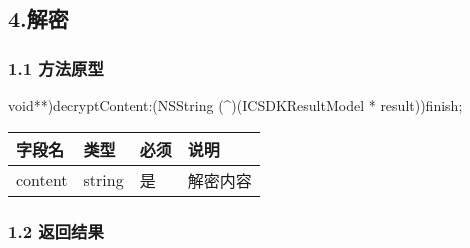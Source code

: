 \documentclass[letterpaper,10pt,english]{sphinxmanual}
\begin{document}

\begin{sphinxVerbatim}[commandchars=\\\{\}]
     
\end{sphinxVerbatim}


\subsection{4.解密}
\label{\detokenize{BCBWalletSDK_u63a5_u53e3_u8bf4_u660e:id95}}

\subsubsection{1.1 方法原型}
\label{\detokenize{BCBWalletSDK_u63a5_u53e3_u8bf4_u660e:id96}}
\sphinxstylestrong{-(}void**)decryptContent:(NSString (\textasciicircum{})(ICSDKResultModel * result))finish;



\begin{savenotes}\sphinxattablestart
\centering
\begin{tabulary}{\linewidth}[t]{|T|T|T|T|}
\hline
\sphinxstyletheadfamily 
字段名
&\sphinxstyletheadfamily 
类型
&\sphinxstyletheadfamily 
必须
&\sphinxstyletheadfamily 
说明
\\
\hline
content
&
string
&
是
&
解密内容
\\
\hline
\end{tabulary}
\par
\sphinxattableend\end{savenotes}


\subsubsection{1.2 返回结果}
\label{\detokenize{BCBWalletSDK_u63a5_u53e3_u8bf4_u660e:id97}}

\begin{sphinxVerbatim}[commandchars=\\\{\}]
     
     
\end{sphinxVerbatim}
\end{document}
